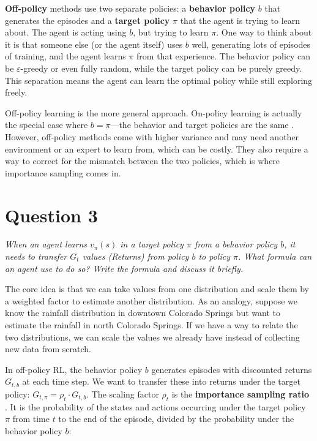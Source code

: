 \documentclass[letterpaper]{article}
\begin{document}
\textbf{Off-policy} methods use two separate policies: a \textbf{behavior policy} $b$ that generates the episodes and a \textbf{target policy} $\pi$ that the agent is trying to learn about. The agent is acting using $b$, but trying to learn $\pi$. One way to think about it is that someone else (or the agent itself) uses $b$ well, generating lots of episodes of training, and the agent learns $\pi$ from that experience. The behavior policy can be $\varepsilon$-greedy or even fully random, while the target policy can be purely greedy. This separation means the agent can learn the optimal policy while still exploring freely.

Off-policy learning is the more general approach. On-policy learning is actually the special case where $b = \pi$---the behavior and target policies are the same \citep{sutton2018reinforcement}. However, off-policy methods come with higher variance and may need another environment or an expert to learn from, which can be costly. They also require a way to correct for the mismatch between the two policies, which is where importance sampling comes in.

\section*{Question 3}
\textit{When an agent learns $v_\pi(s)$ in a target policy $\pi$ from a behavior policy $b$, it needs to transfer $G_t$ values (Returns) from policy $b$ to policy $\pi$. What formula can an agent use to do so? Write the formula and discuss it briefly.}

\vspace{0.5em}

The core idea is that we can take values from one distribution and scale them by a weighted factor to estimate another distribution. As an analogy, suppose we know the rainfall distribution in downtown Colorado Springs but want to estimate the rainfall in north Colorado Springs. If we have a way to relate the two distributions, we can scale the values we already have instead of collecting new data from scratch.

In off-policy RL, the behavior policy $b$ generates episodes with discounted returns $G_{t,b}$ at each time step. We want to transfer these into returns under the target policy: $G_{t,\pi} = \rho_t \cdot G_{t,b}$. The scaling factor $\rho_t$ is the \textbf{importance sampling ratio} \citep{sutton2018reinforcement}. It is the probability of the states and actions occurring under the target policy $\pi$ from time $t$ to the end of the episode, divided by the probability under the behavior policy $b$:
\end{document}
